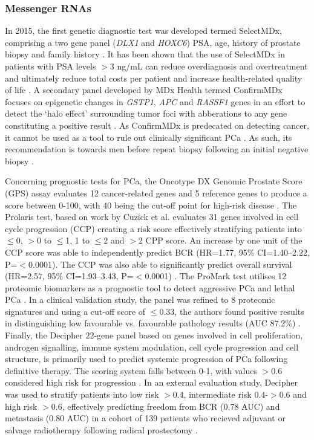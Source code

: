 \subsubsection{Messenger RNAs
}
In 2015, the first genetic diagnostic test was developed termed SelectMDx, comprising a two gene panel (\textit{DLX1} and \textit{HOXC6}) PSA, age, history of prostate biopsy and family history \cite{Leyten2015Jul}. It has been shown that the use of SelectMDx in patients with PSA levels $>$3 ng/mL can reduce overdiagnosis and overtreatment and ultimately reduce total costs per patient and increase health-related quality of life \cite{Dijkstra2017Nov}. A secondary panel developed by MDx Health termed ConfirmMDx focuses on epigenetic changes in \textit{GSTP1}, \textit{APC} and \textit{RASSF1} genes in an effort to detect the `halo effect' surrounding tumor foci with abberations to any gene constituting a positive result \cite{Partin2014Apr}. As ConfirmMDx is predecated on detecting cancer, it cannot be used as a tool to rule out clinically significant PCa \cite{Leapman2016Feb}. As such, its recommendation is towards men before repeat biopsy following an initial negative biopsy \cite{Kretschmer2017Dec}. \par
Concerning prognostic tests for PCa, the Oncotype DX Genomic Prostate Score (GPS) assay evaluates 12 cancer-related genes and 5 reference genes to produce a score between 0-100, with 40 being the cut-off point for high-risk disease \cite{Klein2014Sep, Cullen2020Sep}. The Prolaris test, based on work by Cuzick et al. \cite{Cuzick2011Mar} evaluates 31 genes involved in cell cycle progression (CCP) creating a risk score effectively stratifying patients into $\leq$0, $>$0 to $\leq$1, 1 to $\leq$2 and $>$2 CPP score. An increase by one unit of the CCP score was able to independently predict BCR (HR=1.77, 95\% CI=1.40–2.22, P=$<$0.0001). The CCP was also able to significantly predict overall survival (HR=2.57, 95\% CI=1.93–3.43, P=$<$0.0001) \cite{Cuzick2011Mar}. The ProMark test utilises 12 proteomic biomarkers as a prognostic tool to detect aggressive PCa and lethal PCa \cite{Shipitsin2014a, Shipitsin2014b}. In a clinical validation study, the panel was refined to 8 proteomic signatures and using a cut-off score of $\leq$0.33, the authors found positive results in distinguishing low favourable vs. favourable pathology results (AUC 87.2\%) \cite{Blume-Jensen2015Jun}. Finally, the Decipher 22-gene panel based on genes involved in cell proliferation, androgen signalling, immune system modulation, cell cycle progression and cell structure, is primarily used to predict systemic progression of PCa following definitive therapy. The scoring system falls between 0-1, with values $>$0.6 considered high risk for progression \cite{Nakagawa2008May}. In an external evaluation study, Decipher was used to stratify patients into low risk $>$0.4, intermediate risk 0.4-$>$0.6 and high risk $>$0.6, effectively predicting freedom from BCR (0.78 AUC) and metastasis (0.80 AUC) in a cohort of 139 patients who recieved adjuvant or salvage radiotherapy following radical prostectomy \cite{Den2014Aug}. \par
